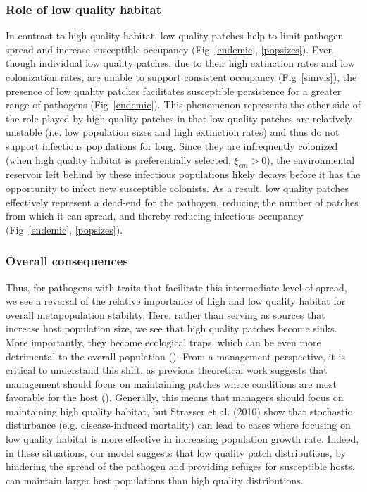 \documentclass{article}
\begin{document}
\subsubsection*{Role of low quality habitat}

In contrast to high quality habitat, low quality patches help to limit pathogen spread and increase susceptible occupancy (Fig~\ref{endemic}, \ref{popsizes}). 
Even though individual low quality patches, due to their high extinction rates and low colonization rates, are unable to support consistent occupancy (Fig~\ref{simvis}), the presence of low quality patches facilitates susceptible persistence for a greater range of pathogens (Fig~\ref{endemic}).  
This phenomenon represents the other side of the role played by high quality patches in that low quality patches are relatively unstable (i.e. low population sizes and high extinction rates) and thus do not support infectious populations for long.
Since they are infrequently colonized (when high quality habitat is preferentially selected, $\xi_{em} > 0$), the environmental reservoir left behind by these infectious populations likely decays before it has the opportunity to infect new susceptible colonists.  
As a result, low quality patches effectively represent a dead-end for the pathogen, reducing the number of patches from which it can spread, and thereby reducing infectious occupancy (Fig~\ref{endemic}, \ref{popsizes}).

\subsubsection*{Overall consequences}

Thus, for pathogens with traits that facilitate this intermediate level of spread, we see a reversal of the relative importance of high and low quality habitat for overall metapopulation stability.
Here, rather than serving as sources that increase host population size, we see that high quality patches become sinks.  
More importantly, they become ecological traps, which can be even more detrimental to the overall population (\cite{Kristan2003}).  
From a management perspective, it is critical to understand this shift, as previous theoretical work suggests that management should focus on maintaining patches where conditions are most favorable for the host (\cite{Strasser2010}). 
Generally, this means that managers should focus on maintaining high quality habitat, but Strasser et al. (2010) show that stochastic disturbance (e.g. disease-induced mortality) can lead to cases where focusing on low quality habitat is more effective in increasing population growth rate.
Indeed, in these situations, our model suggests that low quality patch distributions, by hindering the spread of the pathogen and providing refuges for susceptible hosts, can maintain larger host populations than high quality distributions.  
\end{document}

